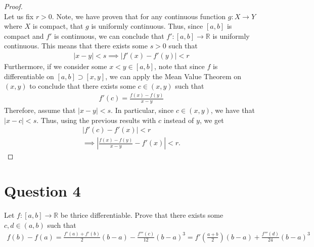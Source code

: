 \documentclass[10pt,a4paper]{article}
\theoremstyle{definition}
\theoremstyle{definition}
\numberwithin{equation}{section}
\begin{document}
\begin{proof}$ $
\\Let us fix $r > 0$. Note, we have proven that for any continuous function $g: X \to Y$ where $X$ is compact, that $g$ is uniformly continuous. Thus, since $[a, b]$ is compact and $f'$ is continuous, we can conclude that $f' : [a, b] \to \mathbb{R}$ is uniformly continuous. This means that there exists some $s > 0$ such that 
\begin{align*}
|x - y| < s \implies |f'(x) - f'(y)| < r
\end{align*}
Furthermore, if we consider some $x < y \in [a, b]$, note that since $f$ is differentiable on $[a, b] \supset [x, y]$, we can apply the Mean Value Theorem on $(x, y)$ to conclude that there exists some $c \in (x, y)$ such that 
\begin{align*}
f'(c) = \frac{f(x) - f(y)}{x - y}
\end{align*}
Therefore, assume that $|x - y| < s$. In particular, since $c \in (x, y)$, we have that $|x - c| < s$. Thus, using the previous results with $c$ instead of $y$, we get
\begin{align*}
|f'(c) - f'(x)| < r\\
\implies \left| \frac{f(x) - f(y)}{x - y} - f'(x) \right| < r.
\end{align*}
\end{proof}

\section*{Question 4}
Let $f: [a, b] \to \mathbb{R}$ be thrice differentiable. Prove that there exists some $c, d \in (a, b)$ such that 
\begin{align*}
f(b) - f(a) = \frac{f'(a) + f'(b)}{2}(b - a) - \frac{f'''(c)}{12}(b - a)^3 = f'\left(\frac{a + b}{2}\right)(b - a) + \frac{f'''(d)}{24}(b - a)^3
\end{align*}
\end{document}
